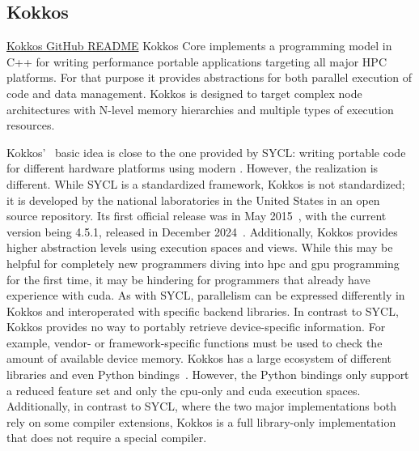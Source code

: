 \subsection{Kokkos}
\label{sec:frameworks:kokkos}

\begin{quotebox}{\href{https://github.com/kokkos/kokkos}{Kokkos GitHub README}}
    Kokkos Core implements a programming model in C++ for writing performance portable applications targeting all major HPC platforms. For that purpose it provides abstractions for both parallel execution of code and data management. Kokkos is designed to target complex node architectures with N-level memory hierarchies and multiple types of execution resources.
\end{quotebox}

Kokkos'~\cite{trott_kokkos_2022} basic idea is close to the one provided by SYCL: writing portable code for different hardware platforms using modern \cpp. 
However, the realization is different. 
While SYCL is a standardized framework, Kokkos is not standardized; it is developed by the national laboratories in the United States in an open source repository. 
Its first official release was in May 2015~\cite{trott_kokkos_2015, carter_edwards_kokkos_2014}, with the current version being 4.5.1, released in December 2024~\cite{noauthor_release_2024}. 
Additionally, Kokkos provides higher abstraction levels using execution spaces and views. 
While this may be helpful for completely new programmers diving into \gls{hpc} and \gls{gpu} programming for the first time, it may be hindering for programmers that already have experience with \gls{cuda}. 
As with SYCL, parallelism can be expressed differently in Kokkos and interoperated with specific backend libraries. 
In contrast to SYCL, Kokkos provides no way to portably retrieve device-specific information. 
For example, vendor- or framework-specific functions must be used to check the amount of available device memory. 
Kokkos has a large ecosystem of different libraries and even Python bindings~\cite{al_awar_performance_2021}.
However, the Python bindings only support a reduced feature set and only the \gls{cpu}-only and \gls{cuda} execution spaces. 
Additionally, in contrast to SYCL, where the two major implementations both rely on some compiler extensions, Kokkos is a full library-only implementation that does not require a special compiler. 

